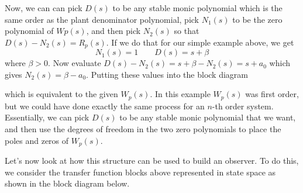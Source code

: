 Now, we can can pick $D(s)$ to be any stable monic polynomial which is the same order as the plant denominator polynomial, pick $N_{1}(s)$ to be the zero polynomial of $W{p}(s)$, and then pick $N_{2}(s)$ so that $D(s)-N_{2}(s)=R_{p}(s)$.
If we do that for our simple example above, we get
\begin{equation*}
  N_{1}(s)=1
  \qquad
  D(s)=s+\beta
\end{equation*}
where $\beta>0$.
Now evaluate $D(s)-N_{2}(s)=s+\beta-N_{2}(s)=s+a_{0}$ which gives $N_{2}(s)=\beta-a_{0}$.
Putting these values into the block diagram
\begin{figure}[H]
  \begin{center}
  \end{center}
\end{figure}
which is equivalent to the given $W_{p}(s)$.
In this example $W_{p}(s)$ was first order, but we could have done exactly the same process for an $n$-th order system.
Essentially, we can pick $D(s)$ to be any stable monic polynomial that we want, and then use the degrees of freedom in the two zero polynomials to place the poles and zeros of $W_{p}(s)$.

Let's now look at how this structure can be used to build an observer.
To do this, we consider the transfer function blocks above represented in state space as shown in the block diagram below.

